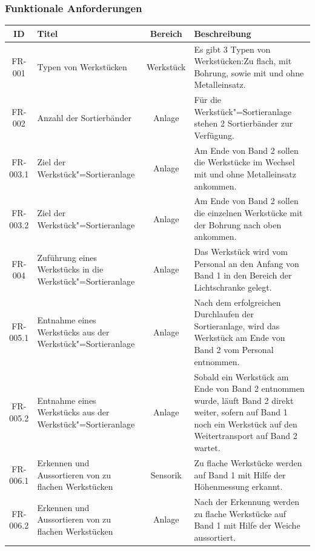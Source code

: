 \documentclass[oneside,a4paper,titlepage]{scrartcl}              %
\begin{document}
\subsubsection{Funktionale Anforderungen}
\begin{small}
  \begin{center}
    \begin{longtable}{|c|p{4cm}|c|p{7cm}|}
      \hline
      \textbf{ID} & \textbf{Titel} & \textbf{Bereich} & \textbf{Beschreibung}\\
      \toprule
      \endhead
      \hline
      FR-001 & Typen von Werkstücken & Werkstück & Es gibt 3 Typen von Werkstücken:Zu flach, mit Bohrung, sowie mit und ohne Metalleinsatz.\\
      \hline
      \rowcolor{lightgray} FR-002 & Anzahl der Sortierbänder & Anlage & Für die Werkstück"=Sortieranlage stehen 2 Sortierbänder zur Verfügung.\\
      \hline
      FR-003.1 & Ziel der Werkstück"=Sortieranlage & Anlage & Am Ende von Band 2 sollen die Werkstücke im Wechsel mit und ohne Metalleinsatz ankommen.\\
      \hline
      FR-003.2 & Ziel der Werkstück"=Sortieranlage & Anlage & Am Ende von Band 2 sollen die einzelnen Werkstücke mit der Bohrung nach oben ankommen.\\
      \hline
      \rowcolor{lightgray} FR-004 & Zuführung eines Werkstücks in die Werkstück"=Sortieranlage & Anlage & Das Werkstück wird vom Personal an den Anfang von Band 1 in den Bereich der Lichtschranke gelegt.\\
      \hline
      FR-005.1 & Entnahme eines Werkstücks aus der Werkstück"=Sortieranlage & Anlage & Nach dem erfolgreichen Durchlaufen der Sortieranlage, wird das Werkstück am Ende von Band 2 vom Personal entnommen.\\
      \hline
      FR-005.2 & Entnahme eines Werkstücks aus der Werkstück"=Sortieranlage & Anlage & Sobald ein Werkstück am Ende von Band 2 entnommen wurde, läuft Band 2 direkt weiter, sofern auf Band 1 noch ein Werkstück auf den Weitertransport auf Band 2 wartet.\\
      \hline
      \rowcolor{lightgray} FR-006.1 & Erkennen und Aussortieren von zu flachen Werkstücken & Sensorik & Zu flache Werkstücke werden auf Band 1 mit Hilfe der Höhenmessung erkannt.\\
      \hline
      \rowcolor{lightgray} FR-006.2 & Erkennen und Aussortieren von zu flachen Werkstücken & Anlage & Nach der Erkennung werden zu flache Werkstücke auf Band 1 mit Hilfe der Weiche aussortiert.\\

\end{longtable}
\end{center}
\end{small}
\end{document}
